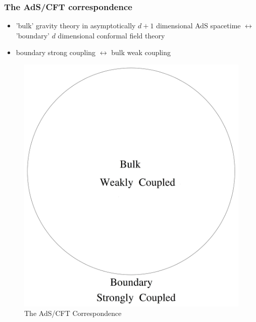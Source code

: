 \documentclass[10pt,aspectratio=169]{beamer}
\begin{document}
\begin{frame}
\frametitle{The AdS/CFT correspondence}

\begin{minipage}[t]{0.48\linewidth}

\begin{itemize}

\item 'bulk' gravity theory in asymptotically $d+1$ dimensional AdS spacetime $\leftrightarrow$ 'boundary' $d$ dimensional conformal field theory

\item boundary strong coupling $\leftrightarrow$ bulk weak coupling

\end{itemize}

\end{minipage}
%
\hfill
%
\begin{minipage}[t]{0.48\linewidth}

\begin{figure}
    \begin{center}
    
        \includegraphics[scale=0.06]{adscft2}    
    
    \end{center}
    \caption{The AdS/CFT Correspondence}
\end{figure}

\end{minipage}

\end{frame}
\end{document}

